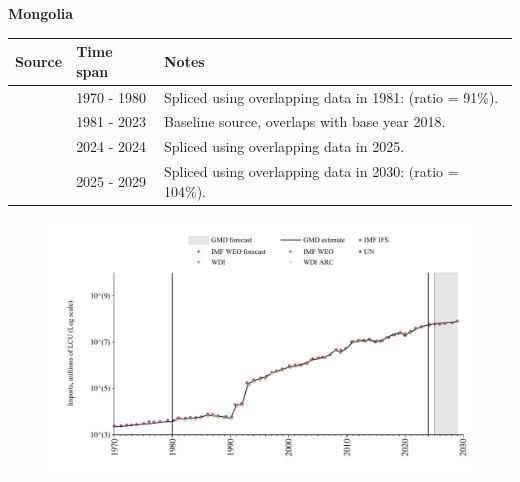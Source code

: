 \documentclass[12pt,a4paper,landscape]{article}
\begin{document}
\begin{adjustbox}{max totalsize={\paperwidth}{\paperheight},center}
\begin{minipage}[t][\textheight][t]{\textwidth}
\vspace*{0.5cm}
{}
\begin{center}
{\Large\bfseries Mongolia}
\end{center}
\vspace{0.5cm}
\begin{table}[H]
\centering
\small
\begin{tabular}{|l|l|l|}
\hline
\textbf{Source} & \textbf{Time span} & \textbf{Notes} \\
\hline
\rowcolor{white}\cite{UN}& 1970 - 1980 &Spliced using overlapping data in 1981: (ratio = 91\%).\\
\rowcolor{lightgray}\cite{WDI}& 1981 - 2023 &Baseline source, overlaps with base year 2018.\\
\rowcolor{white}\cite{IMF_IFS}& 2024 - 2024 &Spliced using overlapping data in 2025.\\
\rowcolor{lightgray}\cite{IMF_WEO_forecast}& 2025 - 2029 &Spliced using overlapping data in 2030: (ratio = 104\%).\\
\hline
\end{tabular}
\end{table}
\begin{figure}[H]
\centering
\includegraphics[width=\textwidth,height=0.6\textheight,keepaspectratio]{graphs/MNG_imports.pdf}
\end{figure}
\end{minipage}
\end{adjustbox}
\end{document}
